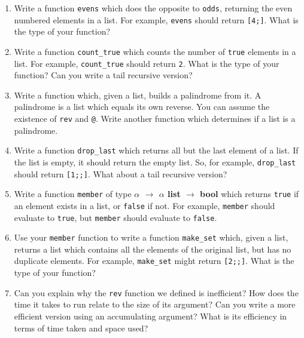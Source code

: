 \documentclass[]{book}
\begin{document}
\begin{enumerate}
  \item Write a function \texttt{evens} which does the opposite to \texttt{odds}, returning the even numbered elements in a list. For example, \texttt{evens\! [2;\! 4;\! 2;\! 4;\! 2]} should return \texttt{[4;]}. What is the type of your function?
  \item Write a function \texttt{count\_true} which counts the number of \texttt{true} elements in a list. For example, \texttt{count\_true} should return \texttt{2}. What is the type of your function? Can you write a tail recursive version?
  \item Write a function which, given a list, builds a palindrome from it. A palindrome is a list which equals its own reverse. You can assume the existence of \texttt{rev} and \texttt{@}. Write another function which determines if a list is a palindrome.
  \item Write a function \texttt{drop\_last} which returns all but the last element of a list. If the list is empty, it should return the empty list. So, for example, \texttt{drop\_last\! [1;\! 2;\! 4;\! 8]} should return \texttt{[1;;]}. What about a tail recursive version?
  \item Write a function \texttt{member} of type \textbf{\textsf {$\alpha$ $\rightarrow$ $\alpha$ list $\rightarrow$ bool}} which returns \texttt{true} if an element exists in a list, or \texttt{false} if not. For example, \texttt{member\! [1;\! 2;\! 3]} should evaluate to \texttt{true}, but \texttt{member\! [1;\! 2]} should evaluate to \texttt{false}. 
  \item Use your \texttt{member} function to write a function \texttt{make\_set} which, given a list, returns a list which contains all the elements of the original list, but has no duplicate elements. For example, \texttt{make\_set\! [1;\! 2;\! 3;\! 3;\! 1]} might return \texttt{[2;;]}. What is the type of your function?
  \item Can you explain why the \texttt{rev} function we defined is inefficient? How does the time it takes to run relate to the size of its argument? Can you write a more efficient version using an accumulating argument? What is its efficiency in terms of time taken and space used?
\end{enumerate}

\cleardoublepage
\thispagestyle{empty}
\\
\end{document}
